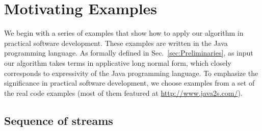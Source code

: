\section{Motivating Examples}
\label{sec:examples}

We begin with a series of examples that show how to apply our algorithm in practical software
development. These examples are written in the Java programming
language. As formally defined in Sec.~\ref{sec:Preliminaries},
as input our algorithm takes terms in applicative long normal
form, which closely corresponds to expressivity of the Java programming language.
To emphasize the significance in practical software development, 
we choose examples from a set of the real code examples (most of them featured at
\url{http://www.java2s.com/}{}).

%
%


\subsection{Sequence of streams}

